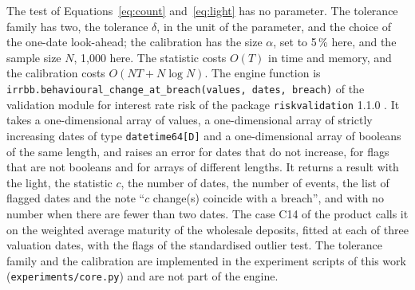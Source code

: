 The test of Equations~\eqref{eq:count} and~\eqref{eq:light} has no parameter. The tolerance family has two, the tolerance $\delta$, in the unit of the parameter, and the choice of the one-date look-ahead; the calibration has the size $\alpha$, set to 5\,\% here, and the sample size $N$, 1,000 here. The statistic costs $O(T)$ in time and memory, and the calibration costs $O(NT+N\log N)$. The engine function is \texttt{irrbb.behavioural\_change\_at\_breach(values, dates, breach)} of the validation module for interest rate risk of the package \texttt{riskvalidation} 1.1.0 \citep{riskvalidation2026}. It takes a one-dimensional array of values, a one-dimensional array of strictly increasing dates of type \texttt{datetime64[D]} and a one-dimensional array of booleans of the same length, and raises an error for dates that do not increase, for flags that are not booleans and for arrays of different lengths. It returns a result with the light, the statistic $c$, the number of dates, the number of events, the list of flagged dates and the note ``$c$ change(s) coincide with a breach'', and with no number when there are fewer than two dates. The case C14 of the product calls it on the weighted average maturity of the wholesale deposits, fitted at each of three valuation dates, with the flags of the standardised outlier test. The tolerance family and the calibration are implemented in the experiment scripts of this work (\texttt{experiments/core.py}) and are not part of the engine.
